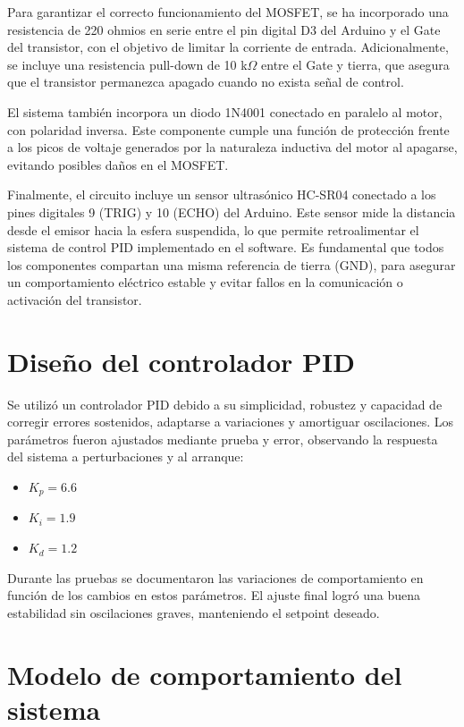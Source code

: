 \documentclass[12pt]{article}
\begin{document}
Para garantizar el correcto funcionamiento del MOSFET, se ha incorporado una resistencia de 220 ohmios en serie entre el pin digital D3 del Arduino y el Gate del transistor, con el objetivo de limitar la corriente de entrada. Adicionalmente, se incluye una resistencia pull-down de 10 k$\Omega$ entre el Gate y tierra, que asegura que el transistor permanezca apagado cuando no exista señal de control.

El sistema también incorpora un diodo 1N4001 conectado en paralelo al motor, con polaridad inversa. Este componente cumple una función de protección frente a los picos de voltaje generados por la naturaleza inductiva del motor al apagarse, evitando posibles daños en el MOSFET.

Finalmente, el circuito incluye un sensor ultrasónico HC-SR04 conectado a los pines digitales 9 (TRIG) y 10 (ECHO) del Arduino. Este sensor mide la distancia desde el emisor hacia la esfera suspendida, lo que permite retroalimentar el sistema de control PID implementado en el software. Es fundamental que todos los componentes compartan una misma referencia de tierra (GND), para asegurar un comportamiento eléctrico estable y evitar fallos en la comunicación o activación del transistor.
    
\section{Diseño del controlador PID}

Se utilizó un controlador PID debido a su simplicidad, robustez y capacidad de corregir errores sostenidos, adaptarse a variaciones y amortiguar oscilaciones. Los parámetros fueron ajustados mediante prueba y error, observando la respuesta del sistema a perturbaciones y al arranque:

\begin{itemize}
\item $K_p = 6.6$
\item $K_i = 1.9$
\item $K_d = 1.2$
\end{itemize}

Durante las pruebas se documentaron las variaciones de comportamiento en función de los cambios en estos parámetros. El ajuste final logró una buena estabilidad sin oscilaciones graves, manteniendo el setpoint deseado.

\section{Modelo de comportamiento del sistema}
\end{document}
